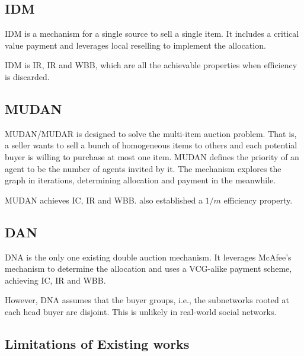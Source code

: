\documentclass[format=acmsmall, review=false, natbib=false]{acmart}
\begin{document}

\subsection{IDM}

IDM\cite{IDM} is a mechanism for a single source to sell a single item.
It includes a critical value payment and leverages local reselling to implement the allocation.\par
IDM is IR, IR and WBB, which are all the achievable properties when efficiency is discarded.

\subsection{MUDAN}

MUDAN/MUDAR\cite{MUDAN-MUDAR} is designed to solve the multi-item auction problem.
That is, a seller wants to sell a bunch of homogeneous items to others and each potential buyer is willing to purchase at most one item.
MUDAN defines the priority of an agent to be the number of agents invited by it.
The mechanism explores the graph in iterations, determining allocation and payment in the meanwhile.\par
MUDAN achieves IC, IR and WBB. \cite{MUDAN-MUDAR} also established a $1/m$ efficiency property.

\subsection{DAN}

DNA\cite{DNA} is the only one existing double auction mechanism.
It leverages McAfee's mechanism to determine the allocation and uses a VCG-alike payment scheme, achieving IC, IR and WBB.\par
However, DNA assumes that the buyer groups, i.e., the subnetworks rooted at each head buyer are disjoint. This is unlikely in real-world social networks.

\subsection{Limitations of Existing works}
\end{document}
